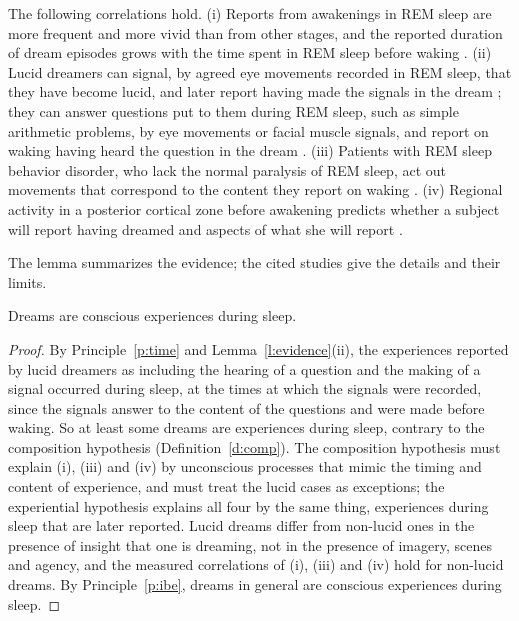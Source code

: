 \documentclass{situationist-preprint}
\begin{document}
\begin{lemma}\label{l:evidence}
The following correlations hold. (i) Reports from awakenings in REM sleep are more frequent and more vivid than from other stages, and the reported duration of dream episodes grows with the time spent in REM sleep before waking \citep{DementKleitman1957}. (ii) Lucid dreamers can signal, by agreed eye movements recorded in REM sleep, that they have become lucid, and later report having made the signals in the dream \citep{LaBerge1981}; they can answer questions put to them during REM sleep, such as simple arithmetic problems, by eye movements or facial muscle signals, and report on waking having heard the question in the dream \citep{Konkoly2021}. (iii) Patients with REM sleep behavior disorder, who lack the normal paralysis of REM sleep, act out movements that correspond to the content they report on waking \citep{Schenck1986}. (iv) Regional activity in a posterior cortical zone before awakening predicts whether a subject will report having dreamed and aspects of what she will report \citep{Siclari2017}.
\end{lemma}

The lemma summarizes the evidence; the cited studies give the details and their limits.

\begin{theorem}\label{t:main}
Dreams are conscious experiences during sleep.
\end{theorem}

\begin{proof}
By Principle~\ref{p:time} and Lemma~\ref{l:evidence}(ii), the experiences reported by lucid dreamers as including the hearing of a question and the making of a signal occurred during sleep, at the times at which the signals were recorded, since the signals answer to the content of the questions and were made before waking. So at least some dreams are experiences during sleep, contrary to the composition hypothesis (Definition~\ref{d:comp}). The composition hypothesis must explain (i), (iii) and (iv) by unconscious processes that mimic the timing and content of experience, and must treat the lucid cases as exceptions; the experiential hypothesis explains all four by the same thing, experiences during sleep that are later reported. Lucid dreams differ from non-lucid ones in the presence of insight that one is dreaming, not in the presence of imagery, scenes and agency, and the measured correlations of (i), (iii) and (iv) hold for non-lucid dreams. By Principle~\ref{p:ibe}, dreams in general are conscious experiences during sleep.
\end{proof}
\end{document}
